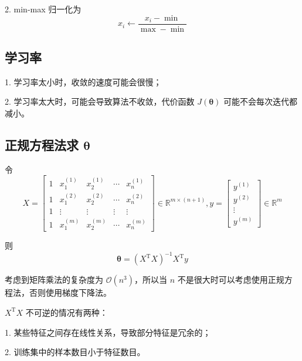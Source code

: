 2. min-max 归一化为
\begin{equation}
    x_i \leftarrow \dfrac{x_i - \min}{\max - \min}
\end{equation}

\subsection{学习率}
1. 学习率太小时，收敛的速度可能会很慢；

2. 学习率太大时，可能会导致算法不收敛，代价函数 $J(\boldsymbol{\theta})$ 可能不会每次迭代都减小。

\subsection{正规方程法求 $\boldsymbol{\theta}$}

令
\begin{equation}
    X = \begin{bmatrix}1 & x^{(1)}_1 & x^{(1)}_2 & \cdots & x^{(1)}_n \\ 1 & x^{(2)}_1 & x^{(2)}_2 & \cdots & x^{(2)}_n 
        \\ 1 & \vdots & \vdots & \vdots & \vdots \\ 1 & x^{(m)}_1 & x^{(m)}_2 & \cdots & x^{(m)}_n\end{bmatrix} \in \mathbb R^{m \times (n+1)},
    y = \begin{bmatrix}y^{(1)} \\ y^{(2)} \\ \vdots \\ y^{(m)}\end{bmatrix} \in \mathbb R^m
\end{equation}

则
\begin{equation}
    \boldsymbol{\theta} = (X^\mathrm T X)^{-1}X^\mathrm Ty
\end{equation}

考虑到矩阵乘法的复杂度为 $\mathcal O(n^3)$，所以当 $n$ 不是很大时可以考虑使用正规方程法，否则使用梯度下降法。

$X^\mathrm T X$ 不可逆的情况有两种：\par
1. 某些特征之间存在线性关系，导致部分特征是冗余的；

2. 训练集中的样本数目小于特征数目。